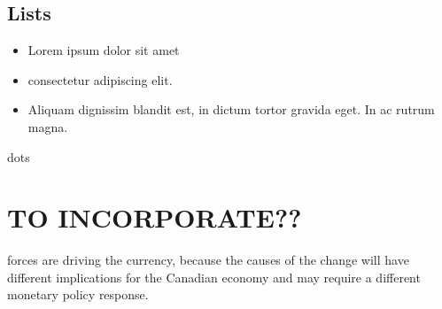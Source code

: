 \documentclass{article}
\begin{document}
\subsection{Lists}
\begin{itemize}
\item Lorem ipsum dolor sit amet
\item consectetur adipiscing elit. 
\item Aliquam dignissim blandit est, in dictum tortor gravida eget. In ac rutrum magna.
\end{itemize}





dots

\section{TO INCORPORATE??}
forces are driving the currency, because the causes of
the change will have different implications for the
Canadian economy and may require a different monetary
policy response. 

\newpage

 

\end{document}
